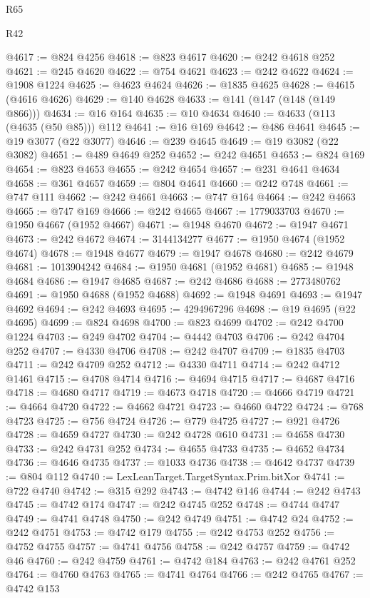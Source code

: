 \begin{lexlean}{R65}
\begin{lexlean}{R42}
\begin{coremodule}
{{{{{{{{{{{{{{{{{{{{{{{{{{{{{{{{{{{{{{{{{{{{{{{{{{{{{{{{{{{{{{{{{{{{{{{{{{{{{{{{{{{{{{{{{{{{{{{{{{{{{{{{{{{{{{{{{{{{{{{{{{{{{{{{{{{{{{{{{{{{{{{{{{{{{{{{{{{{{{{{{{{{{{{{{{{{{{{{{{{{{{{{@4617 := @824 @4256
@4618 := @823 @4617
@4620 := @242 @4618 @252
@4621 := @245 @4620
@4622 := @754 @4621
@4623 := @242 @4622
@4624 := @1908 @1224
@4625 := @4623 @4624
@4626 := @1835 @4625
@4628 := @4615 (@4616 @4626)
@4629 := @140 @4628
@4633 := @141 (@147 (@148 (@149 @866)))
@4634 := @16 @164
@4635 := @10 @4634
@4640 := @4633 (@113 (@4635 (@50 @85))) @112
@4641 := @16 @169
@4642 := @486 @4641
@4645 := @19 @3077 (@22 @3077)
@4646 := @239 @4645
@4649 := @19 @3082 (@22 @3082)
@4651 := @489 @4649 @252
@4652 := @242 @4651
@4653 := @824 @169
@4654 := @823 @4653
@4655 := @242 @4654
@4657 := @231 @4641 @4634
@4658 := @361 @4657
@4659 := @804 @4641
@4660 := @242 @748
@4661 := @747 @111
@4662 := @242 @4661
@4663 := @747 @164
@4664 := @242 @4663
@4665 := @747 @169
@4666 := @242 @4665
@4667 := 1779033703
@4670 := @1950 @4667 (@1952 @4667)
@4671 := @1948 @4670
@4672 := @1947 @4671
@4673 := @242 @4672
@4674 := 3144134277
@4677 := @1950 @4674 (@1952 @4674)
@4678 := @1948 @4677
@4679 := @1947 @4678
@4680 := @242 @4679
@4681 := 1013904242
@4684 := @1950 @4681 (@1952 @4681)
@4685 := @1948 @4684
@4686 := @1947 @4685
@4687 := @242 @4686
@4688 := 2773480762
@4691 := @1950 @4688 (@1952 @4688)
@4692 := @1948 @4691
@4693 := @1947 @4692
@4694 := @242 @4693
@4695 := 4294967296
@4698 := @19 @4695 (@22 @4695)
@4699 := @824 @4698
@4700 := @823 @4699
@4702 := @242 @4700 @1224
@4703 := @249 @4702
@4704 := @4442 @4703
@4706 := @242 @4704 @252
@4707 := @4330 @4706
@4708 := @242 @4707
@4709 := @1835 @4703
@4711 := @242 @4709 @252
@4712 := @4330 @4711
@4714 := @242 @4712 @1461
@4715 := @4708 @4714
@4716 := @4694 @4715
@4717 := @4687 @4716
@4718 := @4680 @4717
@4719 := @4673 @4718
@4720 := @4666 @4719
@4721 := @4664 @4720
@4722 := @4662 @4721
@4723 := @4660 @4722
@4724 := @768 @4723
@4725 := @756 @4724
@4726 := @779 @4725
@4727 := @921 @4726
@4728 := @4659 @4727
@4730 := @242 @4728 @610
@4731 := @4658 @4730
@4733 := @242 @4731 @252
@4734 := @4655 @4733
@4735 := @4652 @4734
@4736 := @4646 @4735
@4737 := @1033 @4736
@4738 := @4642 @4737
@4739 := @804 @112
@4740 := LexLeanTarget.TargetSyntax.Prim.bitXor
@4741 := @722 @4740
@4742 := @315 @292
@4743 := @4742 @146
@4744 := @242 @4743
@4745 := @4742 @174
@4747 := @242 @4745 @252
@4748 := @4744 @4747
@4749 := @4741 @4748
@4750 := @242 @4749
@4751 := @4742 @24
@4752 := @242 @4751
@4753 := @4742 @179
@4755 := @242 @4753 @252
@4756 := @4752 @4755
@4757 := @4741 @4756
@4758 := @242 @4757
@4759 := @4742 @46
@4760 := @242 @4759
@4761 := @4742 @184
@4763 := @242 @4761 @252
@4764 := @4760 @4763
@4765 := @4741 @4764
@4766 := @242 @4765
@4767 := @4742 @153
}}}}}}}}}}}}}}}}}}}}}}}}}}}}}}}}}}}}}}}}}}}}}}}}}}}}}}}}}}}}}}}}}}}}}}}}}}}}}}}}}}}}}}}}}}}}}}}}}}}}}}}}}}}}}}}}}}}}}}}}}}}}}}}}}}}}}}}}}}}}}}}}}}}}}}}}}}}}}}}}}}}}}}}}}}}}}}}}}}}}}}}}
\end{coremodule}
\end{lexlean}
\end{lexlean}
